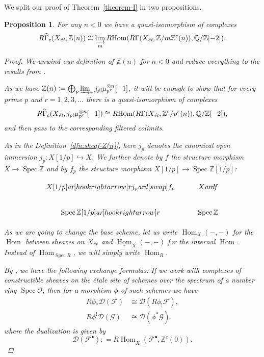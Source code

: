 \documentclass[leqno,12pt]{article}
\theoremstyle{plain}
\newtheorem{proposition}[theorem]{\indent\sc Proposition}
\theoremstyle{definition}
\DeclareMathOperator{\Spec}{Spec}
\DeclareMathOperator{\Hom}{Hom}
\newcommand{\ZZ}{\mathbb{Z}}
\newcommand{\QQ}{\mathbb{Q}}
\newcommand{\dfn}{\mathrel{\mathop:}=}
\newcommand{\et}{\text{\it \'{e}t}}
\newcommand{\ar}{\text{\it ar}}
\newcommand{\iHom}{\underline{\Hom}}
\newcommand{\RHom}{R\!\Hom}
\begin{document}
We split our proof of Theorem~\ref{theorem-I} in two propositions.

\begin{proposition}
  For any $n < 0$ we have a quasi-isomorphism of complexes
  \begin{equation}
    \label{eqn:duality-quasi-isomorphism-1}
    R\widehat{\Gamma}_c (X_\et, \ZZ (n)) \cong
    \varinjlim_m \RHom (R\Gamma (X_\et, \ZZ/m\ZZ^c (n)), \QQ/\ZZ [-2]).
  \end{equation}

  \begin{proof}
    We unwind our definition of $\ZZ (n)$ for $n < 0$ and reduce everything to
    the results from \cite{Geisser-2010}.

    \vspace{1em}

    As we have
    $\ZZ (n) \dfn \bigoplus_p \varinjlim_r j_{p!} \mu_{p^r}^{\otimes n} [-1]$,
    it will be enough to show that for every prime $p$ and $r=1,2,3,\ldots$
    there is a quasi-isomorphism of complexes
    \[ R\widehat{\Gamma}_c (X_\et, j_{p!} \mu_{p^r}^{\otimes n} [-1]) \cong
    \RHom (R\Gamma (X_\et, \ZZ^c/p^r (n)), \QQ/\ZZ [-2]), \]
    and then pass to the corresponding filtered colimits.

    As in the Definition~\ref{dfn:sheaf-Z(n)}, here $j_p$ denotes the canonical
    open immersion $j_p\colon X[1/p] \hookrightarrow X$. We further denote by
    $f$ the structure morphism $X\to \Spec \ZZ$ and by $f_p$ the structure
    morphism $X [1/p] \to \Spec \ZZ [1/p]$:

    \[ \begin{tikzcd}
      X [1/p]\ar[hookrightarrow]{r}{j_p}\ar{d}[swap]{f_p} & X\ar{d}{f} \\
      \Spec \ZZ [1/p]\ar[hookrightarrow]{r} & \Spec \ZZ
    \end{tikzcd} \]

    As we are going to change the base scheme, let us write $\Hom_X (-,-)$ for
    the $\Hom$ between sheaves on $X_\et$ and $\iHom_X (-,-)$ for the
    internal $\Hom$. Instead of $\Hom_{\Spec R}$, we will simply write
    $\Hom_R$.

    By \cite[Proposition~7.10~(c)]{Geisser-2010}, we have the following
    exchange formulas. If we work with complexes of constructible sheaves on the
    \'{e}tale site of schemes over the spectrum of a number ring
    $\Spec\mathcal{O}$, then for a morphism $\phi$ of such schemes we have
    \begin{align}
      \label{eqn:exchange-formula-1} R \phi_* \mathcal{D} (\mathcal{F}) & \cong \mathcal{D} (R \phi_! \mathcal{F}),\\
      \label{eqn:exchange-formula-2} R \phi^! \mathcal{D} (\mathcal{G}) & \cong \mathcal{D} (\phi^* \mathcal{G}),
    \end{align}
    where the dualization is given by
    \[ \mathcal{D} (\mathcal{F}^\bullet) \dfn
    R\iHom_X (\mathcal{F}^\bullet, \ZZ^c (0)). \]


\end{proof}
\end{proposition}
\end{document}
